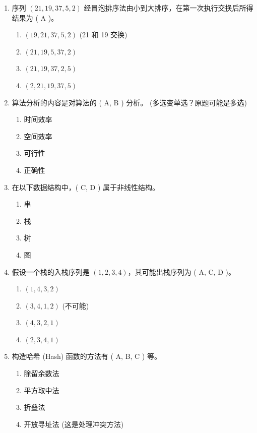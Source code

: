 \documentclass[12pt, a4paper]{article}
\begin{document}
\begin{enumerate}[label=\arabic*.]
    \item 序列 $(21, 19, 37, 5, 2)$ 经冒泡排序法由小到大排序，在第一次执行交换后所得结果为 ( A )。
    \begin{enumerate}
        \item $(19, 21, 37, 5, 2)$ (21 和 19 交换)
        \item $(21, 19, 5, 37, 2)$
        \item $(21, 19, 37, 2, 5)$
        \item $(2, 21, 19, 37, 5)$
    \end{enumerate}

    \item 算法分析的内容是对算法的 ( A, B ) 分析。 (多选变单选？原题可能是多选)
    \begin{enumerate}
        \item 时间效率
        \item 空间效率
        \item 可行性
        \item 正确性
    \end{enumerate}

    \item 在以下数据结构中，( C, D ) 属于非线性结构。
    \begin{enumerate}
        \item 串
        \item 栈
        \item 树
        \item 图
    \end{enumerate}

    \item 假设一个栈的入栈序列是 $(1, 2, 3, 4)$，其可能出栈序列为 ( A, C, D )。
    \begin{enumerate}
        \item $(1, 4, 3, 2)$
        \item $(3, 4, 1, 2)$ (不可能)
        \item $(4, 3, 2, 1)$
        \item $(2, 3, 4, 1)$
    \end{enumerate}

    \item 构造哈希 (Hash) 函数的方法有 ( A, B, C ) 等。
    \begin{enumerate}
        \item 除留余数法
        \item 平方取中法
        \item 折叠法
        \item 开放寻址法 (这是处理冲突方法)
    \end{enumerate}


\end{enumerate}
\end{document}

